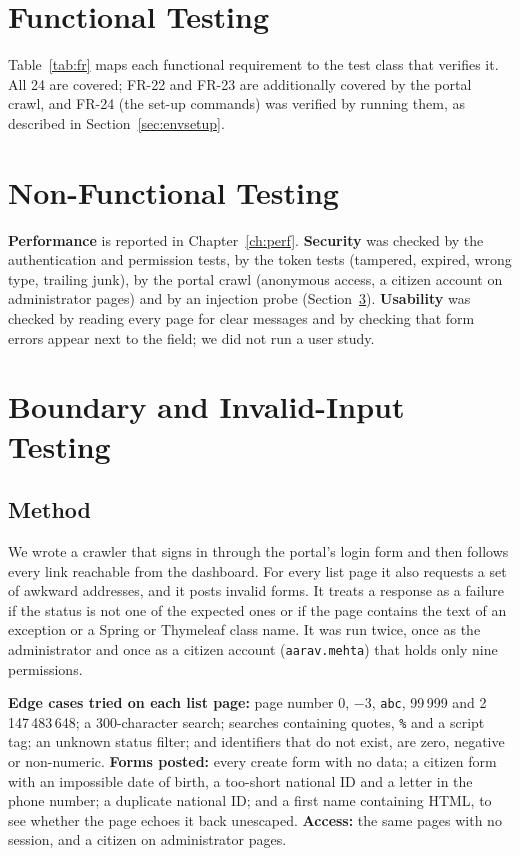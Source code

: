 \section{Functional Testing}
Table~\ref{tab:fr} maps each functional requirement to the test class that verifies it.
All 24 are covered; FR-22 and FR-23 are additionally covered by the portal crawl, and
FR-24 (the set-up commands) was verified by running them, as described in
Section~\ref{sec:envsetup}.

\section{Non-Functional Testing}
\textbf{Performance} is reported in Chapter~\ref{ch:perf}. \textbf{Security} was checked by the
authentication and permission tests, by the token tests (tampered, expired, wrong type,
trailing junk), by the portal crawl (anonymous access, a citizen account on administrator
pages) and by an injection probe (Section~\ref{sec:crawl}). \textbf{Usability} was checked by
reading every page for clear messages and by checking that form errors appear next to the
field; we did not run a user study.

\section{Boundary and Invalid-Input Testing}\label{sec:crawl}
\subsection{Method}
We wrote a crawler that signs in through the portal's login form and then follows every
link reachable from the dashboard. For every list page it also requests a set of awkward
addresses, and it posts invalid forms. It treats a response as a failure if the status is
not one of the expected ones or if the page contains the text of an exception or a Spring
or Thymeleaf class name. It was run twice, once as the administrator and once as a citizen
account (\texttt{aarav.mehta}) that holds only nine permissions.

\textbf{Edge cases tried on each list page:} page number 0, $-3$, \texttt{abc},
99\,999 and 2\,147\,483\,648; a 300-character search; searches containing quotes, \texttt{\%}
and a script tag; an unknown status filter; and identifiers that do not exist, are zero,
negative or non-numeric. \textbf{Forms posted:} every create form with no data; a citizen
form with an impossible date of birth, a too-short national ID and a letter in the phone
number; a duplicate national ID; and a first name containing HTML, to see whether the page
echoes it back unescaped. \textbf{Access:} the same pages with no session, and a citizen
on administrator pages.

